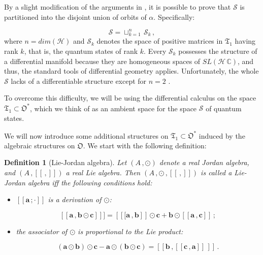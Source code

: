 \documentclass[11pt]{article}
\newcommand{\be}{\begin{equation}}
\newcommand{\ee}{\end{equation}}
\newcommand{\vsp}{\vspace{0.4cm}}
\newcommand{\stsp}{\mathcal{S}}
\newcommand{\obsp}{\mathfrak{O}}
\newtheorem{defn}{Definition}
\begin{document}
By a slight modification of the arguments in \cite{grabowski_kus_marmo-geometry_of_quantum_systems_density_states_and_entanglement}
, it is possible to prove that $\stsp$ is partitioned into the disjoint union of orbits of $\alpha$.
Specifically:

\be
\stsp=\sqcup_{k=1}^{n}\,\stsp_{k}\,,
\ee
where $n=dim(\mathcal{H})$ and $\stsp_{k}$ denotes the space of positive matrices in $\mathfrak{T}_{1}$ having rank $k$, that is, the quantum states of rank $k$.
Every $\stsp_{k}$ possesses the structure of a differential manifold because they are homogeneous spaces of $SL(\mathcal{H}\,\mathbb{C})$, and thus, the standard tools of differential geometry applies.
Unfortunately, the whole $\stsp$ lacks of a differentiable structure except for $n=2$ \cite{grabowski_kus_marmo-geometry_of_quantum_systems_density_states_and_entanglement}.

To overcome this difficulty, we will be using the differential calculus on the space $\mathfrak{T}_{1}\subset\obsp^{*}$, which we think of as an ambient space for the space $\stsp$ of quantum states.


\vsp

We will now introduce some additional structures on $\mathfrak{T}_{1}\subset\obsp^{*}$ induced by the algebraic structures on  $\obsp$.
We start with the following definition:

\begin{defn}[Lie-Jordan algebra]\label{def: lie-jordan algebra}
Let $(A\,,\odot)$ denote a real Jordan algebra, and $(A\,,[[\,,]])$ a real Lie algebra.
Then $(A\,,\odot\,,[[\,,]])$ is called a Lie-Jordan algebra iff the following conditions hold: 
\begin{itemize}
\item $[[\mathbf{a}\,;\cdot]]$ is a derivation of $\odot$:

\be
\left[\left[\mathbf{a}\,,\mathbf{b}\odot \mathbf{c}\right]\right]]=\left[\left[[\mathbf{a}\,,\mathbf{b}\right]\right]\odot \mathbf{c} + \mathbf{b}\odot\left[\left[\mathbf{a}\,,\mathbf{c}\right]\right]\,;
\ee
\item the associator of $\odot$ is proportional to the Lie product:

\be\label{eqn: lo associatore del prodotto di Jordan risulta proporzionale al prodotto di Lie}
\left(\mathbf{a}\odot \mathbf{b}\right)\odot \mathbf{c} - \mathbf{a}\odot\left(\mathbf{b}\odot \mathbf{c}\right)=\left[\left[\mathbf{b}\,,\left[\left[\mathbf{c}\,,\mathbf{a}\right]\right]\,\right]\right]\,.
\ee
\end{itemize}
\end{defn}
\end{document}
